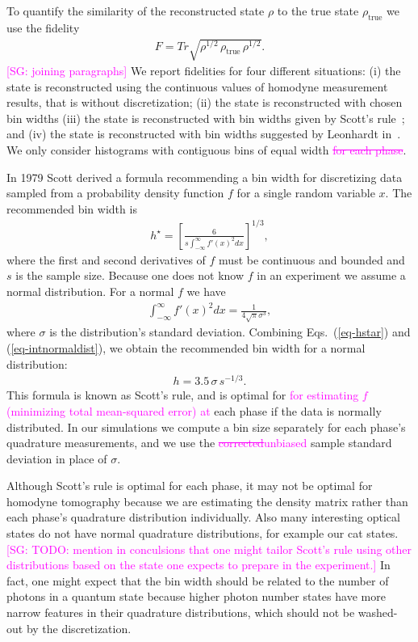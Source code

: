 \documentclass[
reprint,
superscriptaddress,
showpacs,
amsmath,
amssymb,
aps,
pra,
longbibliography
]{revtex4-1}
\providecommand{\aucmnt}[1]{#1}
\providecommand{\editcolor}[2]{\textcolor{#1}{#2}}
\providecommand{\aucmnt}[1]{}
\providecommand{\editcolor}[2]{#2}
\newcommand{\SG}[1]{\editcolor{magenta}{#1}}
\newcommand{\SGs}[1]{\aucmnt{\editcolor{magenta}{\sout{#1}}}}
\newcommand{\SGc}[1]{\aucmnt{\editcolor{magenta}{[SG: #1]}}}
\newcommand{\rhotrue}{\rho_{\text{true}}}
\begin{document}
To quantify the similarity of the reconstructed state $\rho$ to the
true state $\rhotrue$ we use the fidelity
\begin{eqnarray}
  F = Tr \sqrt{\rho^{1/2}\, \rhotrue \, \rho^{1/2}}.
\end{eqnarray}
\SGc{joining paragraphs} We report fidelities for four different
situations: (i) the state is reconstructed using the continuous values
of homodyne measurement results, that is without discretization; (ii)
the state is reconstructed with chosen bin widths (iii) the state is
reconstructed with bin widths given by Scott's rule~\cite{Scott2010};
and (iv) the state is reconstructed with bin widths suggested by
Leonhardt in~\cite{Leonhardt1997}. We only consider histograms with
contiguous bins of equal width\SGs{ for each phase}.

In 1979 Scott derived a formula recommending a bin width for
discretizing data sampled from a probability density function $f$ for
a single random variable $x$. The recommended bin width is
\begin{eqnarray}
  h^{\star} = \left[ \frac{6}{s \int_{-\infty}^{\infty} f'(x)^2 dx} \right]^{1/3},
  \label{eq-hstar}
\end{eqnarray}
where the first and second derivatives of $f$ must be continuous and
bounded and $s$ is the sample size. Because one does not know $f$ in
an experiment we assume a normal distribution. For a normal $f$ we
have
\begin{eqnarray}
  \int_{-\infty}^{\infty} f'(x)^2 dx = \frac{1}{4 \sqrt{\pi} \sigma ^3},
  \label{eq-intnormaldist}
\end{eqnarray}
where $\sigma$ is the distribution's standard deviation.  Combining
Eqs.~(\ref{eq-hstar}) and (\ref{eq-intnormaldist}), we obtain the
recommended bin width for a normal distribution:
\begin{eqnarray}
  h = 3.5 \, \sigma \, s^{-1/3}.
\end{eqnarray}
This formula is known as Scott's rule, and is optimal for \SG{for
  estimating $f$ (minimizing total mean-squared error) at} each phase
if the data is normally distributed. In our simulations we compute a
bin size separately for each phase's quadrature measurements, and we
use the \SGs{corrected}\SG{unbiased} sample standard deviation in
place of $\sigma$.

Although Scott's rule is optimal for each phase, it may not be optimal
for homodyne tomography because we are estimating the density matrix
rather than each phase's quadrature distribution individually.  Also
many interesting optical states do not have normal quadrature
distributions, for example our cat states.  \SGc{TODO: mention in
  conculsions that one might tailor Scott's rule using other
  distributions based on the state one expects to prepare in the
  experiment.} In fact, one might expect that the bin width should be
related to the number of photons in a quantum state because higher
photon number states have more narrow features in their quadrature
distributions, which should not be washed-out by the discretization.
\end{document}
